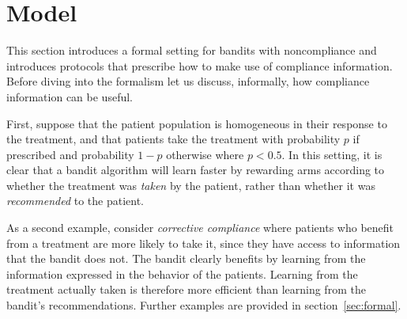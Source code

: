 \section{Model}
\label{sec:noncompliance}

This section introduces a formal setting for bandits with noncompliance and introduces protocols that prescribe how to make use of compliance information. Before diving into the formalism let us discuss, informally, how compliance information can be useful. 

First, suppose that the patient population is homogeneous in their response to the treatment, and that patients take the treatment with probability $p$ if prescribed and probability $1-p$ otherwise where $p<0.5$. In this setting, it is clear that a bandit algorithm will learn faster by rewarding arms according to whether the treatment was \emph{taken} by the patient, rather than whether it was \emph{recommended} to the patient. 

As a second example, consider \emph{corrective compliance} where patients who benefit from a treatment are more likely to take it, since they have access to information that the bandit does not. The bandit clearly benefits by learning from the information expressed in the behavior of the patients. Learning from the treatment actually taken is therefore more efficient than learning from the bandit's recommendations. Further examples are provided in section~\ref{sec:formal}.





